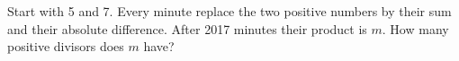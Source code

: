 Start with 5 and 7. Every minute replace the two positive numbers by their sum and their absolute difference. After 2017 minutes their product is $ m $. How many positive divisors does $ m $ have?

